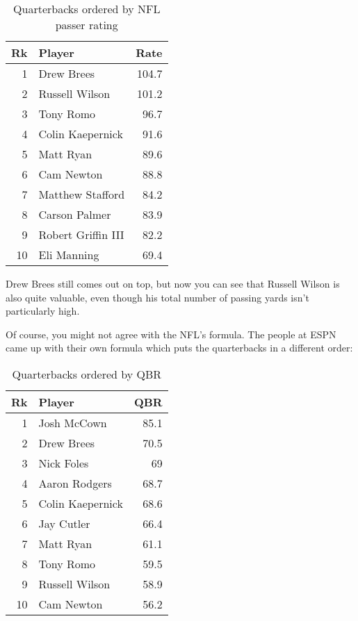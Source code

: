 \documentclass[fleqn, onecolumn]{article}
\begin{document}
  \begin{table}[H]
    \centering
    \begin{tabular}{rlr}
      \toprule
      Rk & Player             &  Rate \\
      \midrule 
      1  & Drew Brees         &  104.7 \\
      2  & Russell Wilson     &  101.2 \\
      3  & Tony Romo          &  96.7 \\
      4  & Colin Kaepernick   &  91.6 \\
      5  & Matt Ryan          &  89.6 \\
      6  & Cam Newton         &  88.8 \\
      7  & Matthew Stafford   &  84.2 \\
      8  & Carson Palmer      &  83.9 \\
      9  & Robert Griffin III &  82.2 \\
      10 & Eli Manning        &  69.4 \\
      \bottomrule 
    \end{tabular}
    \caption{Quarterbacks ordered by NFL passer rating}
  \end{table}

  Drew Brees still comes out on top, but now you can see that Russell Wilson is also quite valuable, even though his
  total number of passing yards isn't particularly high.

  Of course, you might not agree with the NFL's formula.  The people at ESPN came up with their own formula which puts
  the quarterbacks in a different order:

  \begin{table}[H]
    \centering
    \begin{tabular}{rlr}
      \toprule
      Rk & Player           & QBR \\
      \midrule 
      1  & Josh McCown      & 85.1 \\
      2  & Drew Brees       & 70.5 \\
      3  & Nick Foles       & 69 \\
      4  & Aaron Rodgers    & 68.7 \\
      5  & Colin Kaepernick & 68.6 \\
      6  & Jay Cutler       & 66.4 \\
      7  & Matt Ryan        & 61.1 \\
      8  & Tony Romo        & 59.5 \\
      9  & Russell Wilson   & 58.9 \\
      10 & Cam Newton       & 56.2 \\
      \bottomrule 
    \end{tabular}
    \caption{Quarterbacks ordered by QBR}
  \end{table}
\end{document}
